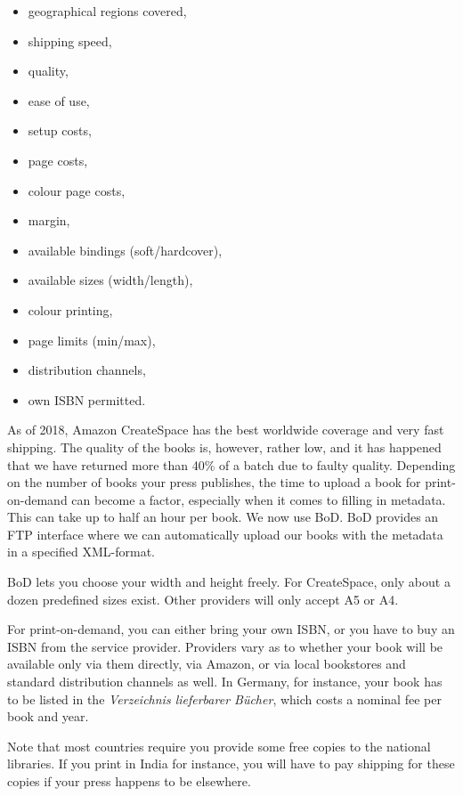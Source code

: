\documentclass[guidelines,nonflat,modfonts] {langsci/langscibook}
\begin{document}
\begin{itemize}
 \item geographical regions covered, 
 \item shipping speed,
 \item quality,
 \item ease of use, 
 \item setup costs, 
 \item page costs, 
 \item colour page costs, 
 \item margin,
 \item available bindings (soft/hardcover), 
 \item available sizes (width/length), 
 \item colour printing, 
 \item page limits (min/max),
 \item distribution channels,
 \item own ISBN permitted.
\end{itemize}

As of 2018, Amazon CreateSpace has the best worldwide coverage and very fast shipping. The quality of the books is, however, rather low, and it has happened that we have returned more than 40\% of a batch due to faulty quality. Depending on the number of books your press publishes, the time to upload a book for print-on-demand can become a factor, especially when it comes to filling in metadata. This can take up to half  an hour per book. We now use BoD. BoD provides an FTP interface where we can automatically upload our books with the metadata in a specified XML-format. 

BoD lets you choose your width and height freely. For CreateSpace, only about a dozen%
 predefined sizes exist. Other providers will only accept A5 or A4. 

For print-on-demand, you can either bring your own ISBN, or you have to buy an ISBN from the service provider. Providers vary as to whether your book will be available only via them directly, via Amazon, or via local bookstores and standard distribution channels as well. In Germany, for instance, your book has to be listed in the \textit{Verzeichnis lieferbarer Bücher}, which costs a nominal fee per book and year.

Note that most countries require you provide some free copies to the national libraries. If you print in India for instance, you will have to pay shipping for these copies if your press happens to be elsewhere.
\end{document}
